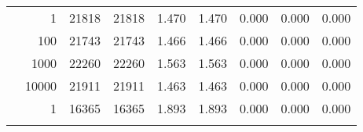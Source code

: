 \begin{table}
\begin{tabular}{rrrrrrrrr}
	            
	        
				\noalign{\smallskip}\hline
				\multirow{ 4 }{*}{ 80000 } &
				
					
					 
					\multirow{ 1 }{*}{ 1 } &
					
						
							    
							     21818  & 21818  
	                           & 1.470 & 1.470 & 0.000
	                           & 0.000 & 0.000  \\
	                
	            
					 &  
					 
					\multirow{ 1 }{*}{ 100 } &
					
						
							    
							     21743  & 21743  
	                           & 1.466 & 1.466 & 0.000
	                           & 0.000 & 0.000  \\
	                
	            
					 &  
					 
					\multirow{ 1 }{*}{ 1000 } &
					
						
							    
							     22260  & 22260  
	                           & 1.563 & 1.563 & 0.000
	                           & 0.000 & 0.000  \\
	                
	            
					 &  
					 
					\multirow{ 1 }{*}{ 10000 } &
					
						
							    
							     21911  & 21911  
	                           & 1.463 & 1.463 & 0.000
	                           & 0.000 & 0.000  \\
	                
	            
	        
				\noalign{\smallskip}\hline
				\multirow{ 4 }{*}{ 160000 } &
				
					
					 
					\multirow{ 1 }{*}{ 1 } &
					
						
							    
							     16365  & 16365  
	                           & 1.893 & 1.893 & 0.000
	                           & 0.000 & 0.000  \\
	                
	            
					 &  
					 

\end{tabular}
\end{table}
